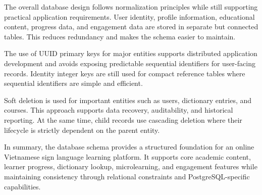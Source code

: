 The overall database design follows normalization principles while still supporting practical application requirements. User identity, profile information, educational content, progress data, and engagement data are stored in separate but connected tables. This reduces redundancy and makes the schema easier to maintain.

The use of UUID primary keys for major entities supports distributed application development and avoids exposing predictable sequential identifiers for user-facing records. Identity integer keys are still used for compact reference tables where sequential identifiers are simple and efficient.

Soft deletion is used for important entities such as users, dictionary entries, and courses. This approach supports data recovery, auditability, and historical reporting. At the same time, child records use cascading deletion where their lifecycle is strictly dependent on the parent entity.

In summary, the database schema provides a structured foundation for an online Vietnamese sign language learning platform. It supports core academic content, learner progress, dictionary lookup, microlearning, and engagement features while maintaining consistency through relational constraints and PostgreSQL-specific capabilities.
